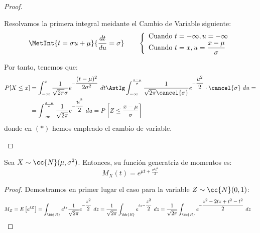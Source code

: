 \begin{proof}
\begin{enumerate}
        Resolvamos la primera integral meidante el Cambio de Variable siguiente:
        \begin{equation*}
            \MetInt{t = \sigma u + \mu}{\dfrac{dt}{du} = \sigma} \qquad
            \left\{
                \begin{array}{l}
                    \text{Cuando } t = -\infty, u = -\infty\\
                    \text{Cuando } t = x, u = \dfrac{x-\mu}{\sigma}
                \end{array}
            \right.
        \end{equation*}

        Por tanto, tenemos que:
        \begin{align*}
            P[X\leq x] &= \int_{-\infty}^{x} \dfrac{1}{\sqrt{2\pi}\sigma} e^{-\dfrac{(t-\mu)^2}{2\sigma^2}}~dt
            \AstIg \int_{-\infty}^{\frac{x-\mu}{\sigma}} \dfrac{1}{\sqrt{2\pi}\cancel{\sigma}} e^{-\dfrac{u^2}{2}}\cdot \cancel{\sigma} ~ du
            =\\&= \int_{-\infty}^{\frac{x-\mu}{\sigma}} \dfrac{1}{\sqrt{2\pi}} e^{-\dfrac{u^2}{2}}~du
            = P\left[Z\leq \dfrac{x-\mu}{\sigma}\right]
        \end{align*}
        donde en $(\ast)$ hemos empleado el cambio de variable.
    \end{enumerate}
\end{proof}

\begin{prop}
    Sea $X\sim \cc{N}(\mu,\sigma^2)$. Entonces, su función generatriz de momentos es:
    \begin{equation*}
        M_X(t) = e^{\mu t + \frac{\sigma^2 t^2}{2}}
    \end{equation*}
\end{prop}
\begin{proof}
    Demostramos en primer lugar el caso para la variable $Z\sim \cc{N}(0,1)$:
    \begin{align*}
        M_Z &= E\left[e^{tZ}\right]
        = \int_\bb{R} e^{tz} \dfrac{1}{\sqrt{2\pi}} e^{-\dfrac{z^2}{2}}~dz
        = \dfrac{1}{\sqrt{2\pi}} \int_\bb{R} e^{tz-\dfrac{z^2}{2}}~dz
        = \dfrac{1}{\sqrt{2\pi}} \int_\bb{R} e^{-\dfrac{z^2-2tz + t^2-t^2}{2}}~dz
    \end{align*}
\end{proof}